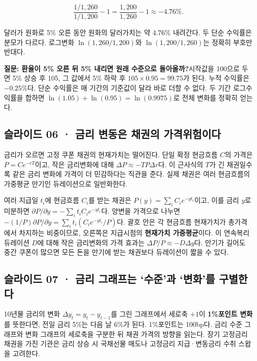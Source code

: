 \documentclass[11pt,a4paper]{article}
\begin{document}
\[
\frac{1/1{,}260}{1/1{,}200}-1=\frac{1{,}200}{1{,}260}-1\approx-4.76\%.
\]

달러가 원화로 5\% 오른 동안 원화의 달러가치는 약 4.76\% 내려간다. 두 단순 수익률은 분모가 다르다. 로그변화 $\ln(1{,}260/1{,}200)$와 $\ln(1{,}200/1{,}260)$는 정확히 부호만 반대다.\par

\par\medskip\noindent\textbf{질문: 환율이 5\% 오른 뒤 5\% 내리면 원래 수준으로 돌아올까?}\quad 시작값을 100으로 두면 5\% 상승 후 105, 그 값에서 5\% 하락 후 $105\times0.95=99.75$가 된다. 누적 수익률은 $-0.25\%$다. 단순 수익률은 매 기간의 기준값이 달라 바로 더할 수 없다. 두 기간 로그수익률을 합하면 $\ln(1.05)+\ln(0.95)=\ln(0.9975)$로 전체 변화를 정확히 얻는다.\par

\subsection{슬라이드 06 · 금리 변동은 채권의 가격위험이다}
금리가 오르면 고정 쿠폰 채권의 현재가치는 떨어진다. 단일 확정 현금흐름 $C$의 가격은 $P=C e^{-rT}$이고, 작은 금리변화에 대해 $\Delta P\approx -T P\Delta r$다. 이 근사식의 $T$가 긴 채권일수록 같은 금리 변화에 가격이 더 민감하다는 직관을 준다. 실제 채권은 여러 현금흐름의 가중평균 만기인 듀레이션으로 일반화한다.\par

여러 지급일 $t_i$에 현금흐름 $C_i$를 받는 채권은 $P(y)=\sum_i C_i e^{-yt_i}$이고, 이를 금리 $y$로 미분하면 $\partial P/\partial y=-\sum_i t_i C_i e^{-yt_i}$다. 양변을 가격으로 나누면 $-(1/P)\partial P/\partial y=\sum_i t_i(C_i e^{-yt_i}/P)$다. 괄호 안은 각 현금흐름 현재가치가 총가격에서 차지하는 비중이므로, 오른쪽은 지급시점의 \textbf{현재가치 가중평균}이다. 이 연속복리 듀레이션 $D$에 대해 작은 금리변화의 가격 효과는 $\Delta P/P\approx-D\Delta y$다. 만기가 길어도 중간 쿠폰이 많으면 모든 돈을 만기에 받는 채권보다 듀레이션이 짧을 수 있다.\par

\subsection{슬라이드 07 · 금리 그래프는 ‘수준’과 ‘변화’를 구별한다}
10년물 금리의 변화 $\Delta y_t=y_t-y_{t-1}$를 그린 그래프에서 세로축 $+1$이 \textbf{1\%포인트 변화}를 뜻한다면, 전일 금리 5\%는 다음 날 6\%가 된다. 1\%포인트는 100bp다. 금리 수준 그래프와 변화 그래프의 세로축을 구분한 뒤 채권 가격의 방향을 읽는다. 장기 고정금리 채권을 가진 기관은 금리 상승 시 국채선물 매도나 고정금리 지급·변동금리 수취 스왑을 고려한다.\par
\end{document}
